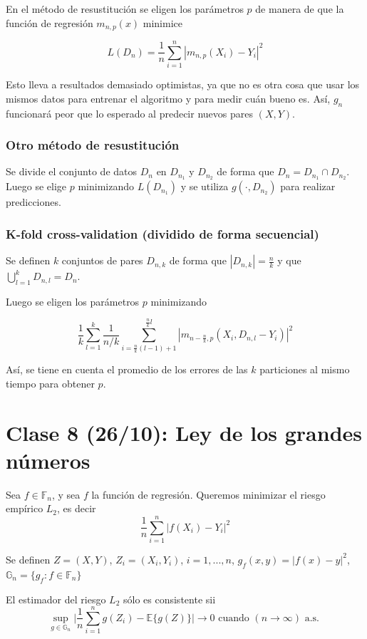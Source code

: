\documentclass[12pt, a4paper]{article}
\begin{document}
En el método de resustitución se eligen los parámetros $p$ de manera de que la función de regresión $m_{n,p}(x)$ minimice

$$L(D_n) = \frac{1}{n} \sum_{i=1}^n | m_{n,p}(X_i)-Y_i |^2 $$

Esto lleva a resultados demasiado optimistas, ya que no es otra cosa que usar los mismos datos para entrenar el algoritmo y para medir cuán bueno es. Así, $g_n$ funcionará peor que lo esperado al predecir nuevos pares $(X,Y)$.

\subsubsection{Otro método de resustitución}

Se divide el conjunto de datos $D_n$ en $D_{n_1}$ y $D_{n_2}$ de forma que $D_n=D_{n_1} \cap D_{n_2}$. Luego se elige $p$ minimizando $L(D_{n_1})$ y se utiliza $g(\cdot,D_{n_2})$ para realizar predicciones.

\subsubsection{K-fold cross-validation (dividido de forma secuencial)}

Se definen $k$ conjuntos de pares $D_{n,k}$ de forma que $|D_{n,k}|=\frac{n}{k}$  y que $\bigcup_{l=1}^{k}D_{n,l}=D_n$.

Luego se eligen los parámetros $p$ minimizando

$$ \frac{1}{k} \sum_{l=1}^{k} \frac{1}{n/k} \sum_{i=\frac{n}{k}(l-1)+1}^{\frac{n}{k} l} | m_{n-\frac{n}{k},p}(X_i,D_{n,l} -Y_i) |^2 $$

Así, se tiene en cuenta el promedio de los errores de las $k$ particiones al mismo tiempo para obtener $p$.

\section{Clase 8 (26/10): Ley de los grandes números}

Sea $ f\in \mathds{F}_n$, y sea $f$ la función de regresión. Queremos minimizar el riesgo empírico $L_2$, es decir $$ \frac{1}{n} \sum_{i=1}^n |f(X_i)-Y_i|^2 $$

Se definen $Z=(X,Y)$, $Z_i=(X_i,Y_i)$, $i=1, ..., n$, $g_f(x,y)=|f(x)-y|^2$, $\mathds{G}_n=\{ g_f :f \in \mathds{F}_n\}$

El estimador del riesgo $L_2$ sólo es consistente sii $$ \mathop{sup}_{g\in\mathds{G}_n} \Bigg | \frac{1}{n} \sum_{i=1}^n g(Z_i) - \mathds{E}\{g(Z)\} \Bigg | \rightarrow 0 \text{ cuando } (n\rightarrow \infty) \text{ a.s. }$$
\end{document}
